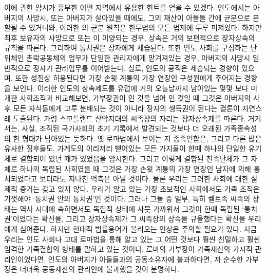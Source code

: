 이에 관한 암시가 풍부한 어떤 지역에서 유용한 힌트를 얻을 수 있겠다.
인도에서는
아버지의 사망시, 또는 아버지가 살아있을 때에도,
그의 재산이 아들들 간에 균분으로 분할될 수 있거니와,
이러한 의 균분 원칙은 힌두법의 모든 법제에
두루 퍼져있다.
하지만 최후 보유자의 사망으로  또는 이
이양되는 경우, 상속은 거의 보편적으로 장자상속의 규칙을 따른다.
그리하여 통치권은 장자에게 세습된다.
또한 인도 사회를 구성하는 단위체인 촌락공동체의 업무가
단일한 관리자에게 맡겨져있는 경우,
아버지의 사망시
일반적으로 장자가
관리업무를 이어받는다.
실로, 인도의 공직은 세습되는 경향이 있으며, 또한
성질상 허용된다면
가장 손윗 계통의 가장 연장인 구성원에게 주어지는 경향을 보인다.
이러한 인도의 상속제도를
유럽에 거의 오늘날까지 남아있는 몇몇 보다 미개한 사회조직과
비교해보면,
가부장권이 인 것을 넘어 인 것일 때
그것은 아버지의 사후 모든 자식들에게 고루 분배되는 것이 아니라
장자의 생득권이 된다는 결론이 자연스레 도출된다.
가령 스코틀랜드 산악지대의 씨족장의 자리는
장자상속제를 따른다.
거기서는, 사실, 조직된 국가사회의 초기 기록에서 발견되는 것보다
더 오래된 가족종속성의 한 형태가 남아있는 듯하다.
옛 로마법에서 보이는 저 종족연합은,
그리고 다른 많은 유사한 징후들도,
가계도의 이리저리 뻗어있는 모든 가지들이 한때
하나의 단일한 유기체로 결합되어 있던 때가 있었음을 암시한다.
그리고 이렇게 결합된 친족단체가 그 자체로 하나의 독립된 사회였을 때
그것은 가장 손윗 계통의 가장 연장인 남자에 의해 통치되었다고 보더라도
지나친 억측은 아닐 것이다.
물론 우리는 그러한 사회에 대한 실제적 증거는 갖고 있지 않다.
우리가 알고 있는 가장 초보적인 사회에서도
가족 조직은 기껏해야 `통치권 안의 통치권'인 것이다.
그러나 그들 중 일부, 특히 켈트족 씨족의 상태는
역사 시대에 속하면서도 독립적 상태에 사뭇 가까워서
그것이 한때 독립된 `통치권'이었다는 확신을,
그리고 장자상속제가 그 씨족장의 상속을 규율했다는 확신을 우리에게 심어준다.
하지만 현대적 법률용어가 불러오는 인상은 주의할 필요가 있다.
지금 우리는 인도 사회나 고대 로마법을 통해 알고 있는 그 어떤 것보다
훨씬 친밀하고 훨씬 엄격한 가족결합의 형태를 말하고 있는 것이다.
로마의 가부장이 가족재산의 가시적 관리인이었다면,
인도의 아버지가 아들들과의 공동소유자에 불과하다면,
저 순수한 가부장은 더더욱 공동재산의 관리인에 불과했을 것이 분명하다.

